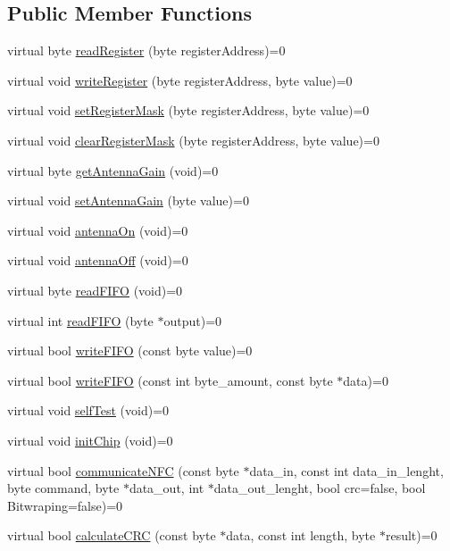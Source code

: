 \subsection*{Public Member Functions}
\begin{DoxyCompactItemize}
\item 
virtual byte \hyperlink{classnfccontroler_aaf3c333dece31c91679bb60a58bf1ef9}{read\+Register} (byte register\+Address)=0
\item 
virtual void \hyperlink{classnfccontroler_a0ea9c75e4dbe9dbeb81b49cac5e382db}{write\+Register} (byte register\+Address, byte value)=0
\item 
virtual void \hyperlink{classnfccontroler_af35dd99e72c2321c50dec98529e04a83}{set\+Register\+Mask} (byte register\+Address, byte value)=0
\item 
virtual void \hyperlink{classnfccontroler_a02cfe73ff95bd107f2020ada91ac7af4}{clear\+Register\+Mask} (byte register\+Address, byte value)=0
\item 
virtual byte \hyperlink{classnfccontroler_a99c9451d564a62c525925f8ca79a9d1e}{get\+Antenna\+Gain} (void)=0
\item 
virtual void \hyperlink{classnfccontroler_ae76958998275b8e4acc04c1fe61998e5}{set\+Antenna\+Gain} (byte value)=0
\item 
virtual void \hyperlink{classnfccontroler_a161af319560127b028504add241a8bc6}{antenna\+On} (void)=0
\item 
virtual void \hyperlink{classnfccontroler_a0d8180637c367d223d437a506a641bae}{antenna\+Off} (void)=0
\item 
virtual byte \hyperlink{classnfccontroler_afcab6129cc6c97452f998c46e8088d01}{read\+F\+I\+FO} (void)=0
\item 
virtual int \hyperlink{classnfccontroler_ac1b18db7bd72cf1a2d6cd995ee3919cb}{read\+F\+I\+FO} (byte $\ast$output)=0
\item 
virtual bool \hyperlink{classnfccontroler_aef681b8f4a4a7d982c30ee2d9e8124da}{write\+F\+I\+FO} (const byte value)=0
\item 
virtual bool \hyperlink{classnfccontroler_a5e9de8b00b7bea62fe4f422a898018a9}{write\+F\+I\+FO} (const int byte\+\_\+amount, const byte $\ast$data)=0
\item 
virtual void \hyperlink{classnfccontroler_adf8ddf5ba68a3d6689f5cdc15e294151}{self\+Test} (void)=0
\item 
virtual void \hyperlink{classnfccontroler_a4f5a22e5f25f56abe26ed0034a296135}{init\+Chip} (void)=0
\item 
virtual bool \hyperlink{classnfccontroler_a742e67e43b865074c4f23fb6c133cdd7}{communicate\+N\+FC} (const byte $\ast$data\+\_\+in, const int data\+\_\+in\+\_\+lenght, byte command, byte $\ast$data\+\_\+out, int $\ast$data\+\_\+out\+\_\+lenght, bool crc=false, bool Bitwraping=false)=0
\item 
virtual bool \hyperlink{classnfccontroler_ab03f284aa4ce7e327b61134e5473c869}{calculate\+C\+RC} (const byte $\ast$data, const int length, byte $\ast$result)=0
\end{DoxyCompactItemize}


